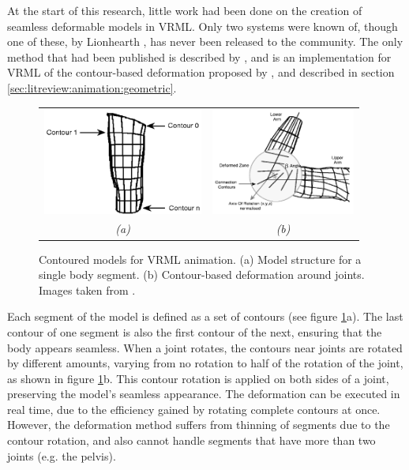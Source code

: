 At the start of this research, little work had been done on the creation of seamless deformable models in VRML. Only two systems were known of, though one of these, by Lionhearth \cite{Lionhearth}, has never been released to the community. The only method that had been published is described by \citet{Babski99}, and is an implementation for VRML of the contour-based deformation proposed by \citet{Thalmann96}, and described in section \ref{sec:litreview:animation:geometric}.
\begin{figure}
\begin{center}
\begin{tabular}{cc}
\includegraphics[height=3.5cm]{../images/babski_contours} &
\includegraphics[height=3.5cm]{../images/babski_deformation} \\
{\it(a)} & {\it(b)}
\end{tabular}
\caption[Contoured models for VRML animation]{\label{fig:babskimodels}Contoured models for VRML animation. (a) Model structure for a single body segment. (b) Contour-based deformation around joints. Images taken from \cite{Babski99}.}
\end{center}
\end{figure}
Each segment of the model is defined as a set of contours (see figure \ref{fig:babskimodels}a). The last contour of one segment is also the first contour of the next, ensuring that the body appears seamless. When a joint rotates, the contours near joints are rotated by different amounts, varying from no rotation to half of the rotation of the joint, as shown in figure \ref{fig:babskimodels}b. This contour rotation is applied on both sides of a joint, preserving the model's seamless appearance. The deformation can be executed in real time, due to the efficiency gained by rotating complete contours at once. However, the deformation method suffers from thinning of segments due to the contour rotation, and also cannot handle segments that have more than two joints (e.g. the pelvis).

